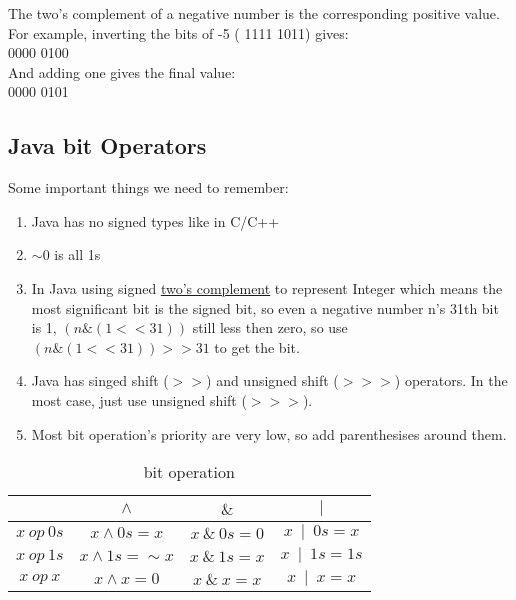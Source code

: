 The two's complement of a negative number is the corresponding positive value. For example, inverting the bits of -5 ( 1111 1011) gives:  \\
0000 0100  \\
And adding one gives the final value:  \\
0000 0101  \\

\subsection{Java bit Operators  }

Some important things we need to remember:
\begin{enumerate}
    \item Java has no signed types like in C/C++    

    \item   ${\sim0}$ is all 1s

    \item In Java using signed \href{http://mitpress.mit.edu/books/introduction-algorithms}{two's complement}  to represent Integer which means the most significant bit is the signed bit, so even a negative number n's 31th bit is 1, ${  ( n \& (1 << 31 ) )}$ still less then zero, so use ${  (  n \& (1 << 31 ) ) >> 31 }$ to get the bit.
        
    \item   Java has singed shift (${>>}$) and unsigned shift  (${>>>}$) operators. In the most case, just use unsigned shift  (${>>>}$).
        
    \item Most bit operation's priority are very low, so add parenthesises around them.  

\end{enumerate}

\begin{table}[ht]
\caption{  bit operation } %
\centering %
\begin{tabular}{ | c | c | c | c  |  }
\hline
                         &  ${ \wedge  }$             &  ${ \&   }$       &  ${ \mid  }$       \\
 \hline
        ${x ~ op ~ 0s  }$    & ${x \wedge 0s =x}$         &  ${x~\&~0s =0}$   &  ${x~\mid~0s = x }$       \\
 \hline
        ${x ~ op ~ 1s  }$    & ${x \wedge 1s = \sim x}$   &  ${x~\&~1s =x}$   &  ${x~\mid~1s = 1s}$        \\
 \hline
        ${x ~ op  ~x  }$     & ${x \wedge x =0 }$         &  ${x~\&~x = x}$   &   ${x~\mid~x = x}$     \\
 \hline
        

\end{tabular}
\label{tab:bit_opt} %

\end{table}


